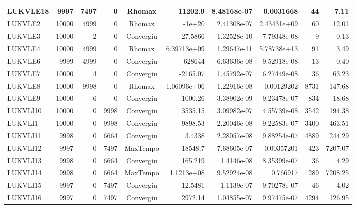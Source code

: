 \begin{center}
\begin{longtable}{|l|r|r|r|c|r|r|r|r|r|}
LUKVLE18 &   9997 &   7497 &      0 & Rhomax     &     11202.9 &    8.48168e-07 &   0.0031668 &     44 &    7.11 \\ \hline
 LUKVLE2 &  10000 &   4999 &      0 & Rhomax     &      -1e+20 &    2.41308e-07 & 2.43431e+09 &     60 &   12.01 \\ \hline
 LUKVLE3 &  10000 &      2 &      0 & Convergiu  &     27.5866 &    1.32528e-10 & 7.79348e-08 &      9 &    0.13 \\ \hline
 LUKVLE4 &  10000 &   4999 &      0 & Rhomax     & 6.39713e+09 &    1.29647e-11 & 5.78738e+13 &     91 &    3.49 \\ \hline
 LUKVLE6 &   9999 &   4999 &      0 & Convergiu  &      628644 &    6.63636e-08 & 9.52918e-08 &     13 &    0.40 \\ \hline
 LUKVLE7 &  10000 &      4 &      0 & Convergiu  &    -2165.07 &    1.45792e-07 & 6.27449e-08 &     36 &   63.23 \\ \hline
 LUKVLE8 &  10000 &   9998 &      0 & Rhomax     & 1.06096e+06 &    1.22916e-08 &  0.00129202 &   8731 &  147.68 \\ \hline
 LUKVLE9 &  10000 &      6 &      0 & Convergiu  &     1000.26 &    3.38902e-09 & 9.23478e-07 &    834 &   18.68 \\ \hline
LUKVLI10 &  10000 &      0 &   9998 & Convergiu  &     3535.15 &    3.09982e-07 & 4.55739e-08 &   3542 &  194.38 \\ \hline
 LUKVLI1 &  10000 &      0 &   9998 & Convergiu  &     9898.53 &    2.20046e-08 & 9.22583e-07 &   3400 &  463.51 \\ \hline
LUKVLI11 &   9998 &      0 &   6664 & Convergiu  &      3.4338 &    2.28057e-08 & 9.88254e-07 &   4889 &  244.29 \\ \hline
LUKVLI12 &   9997 &      0 &   7497 & MaxTempo   &     18548.7 &    7.68605e-07 &  0.00357201 &    423 & 7207.07 \\ \hline
LUKVLI13 &   9998 &      0 &   6664 & Convergiu  &     165.219 &     1.4146e-08 & 8.35399e-07 &     36 &    4.29 \\ \hline
LUKVLI14 &   9998 &      0 &   6664 & MaxTempo   &  1.1213e+08 &    9.52924e-08 &    0.766917 &    289 & 7208.25 \\ \hline
LUKVLI15 &   9997 &      0 &   7497 & Convergiu  &     12.5481 &     1.1139e-07 & 9.70278e-07 &     46 &    4.02 \\ \hline
LUKVLI16 &   9997 &      0 &   7497 & Convergiu  &     2972.14 &    1.04855e-07 & 9.97475e-07 &   4294 &  126.95 \\ \hline

\end{longtable}
\end{center}
